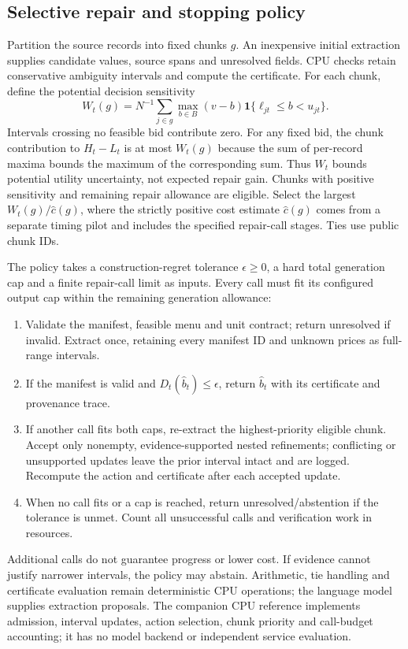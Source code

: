 \documentclass[sigconf,anonymous,nonacm]{acmart}
\begin{document}
\subsection{Selective repair and stopping policy}
Partition the source records into fixed chunks $g$. An inexpensive initial extraction supplies candidate values, source spans and unresolved fields. CPU checks retain conservative ambiguity intervals and compute the certificate. For each chunk, define the potential decision sensitivity
\[
W_t(g)=N^{-1}\sum_{j\in g}\max_{b\in B}
(v-b)\mathbf1\{\ell_{jt}\leq b<u_{jt}\}.
\]
Intervals crossing no feasible bid contribute zero. For any fixed bid, the chunk contribution to $H_t-L_t$ is at most $W_t(g)$ because the sum of per-record maxima bounds the maximum of the corresponding sum. Thus $W_t$ bounds potential utility uncertainty, not expected repair gain. Chunks with positive sensitivity and remaining repair allowance are eligible. Select the largest $W_t(g)/\widehat c(g)$, where the strictly positive cost estimate $\widehat c(g)$ comes from a separate timing pilot and includes the specified repair-call stages. Ties use public chunk IDs.

The policy takes a construction-regret tolerance $\epsilon\geq0$, a hard total generation cap and a finite repair-call limit as inputs. Every call must fit its configured output cap within the remaining generation allowance:
\begin{enumerate}
\item Validate the manifest, feasible menu and unit contract; return unresolved if invalid. Extract once, retaining every manifest ID and unknown prices as full-range intervals.
\item If the manifest is valid and $D_t(\widehat b_t)\leq\epsilon$, return $\widehat b_t$ with its certificate and provenance trace.
\item If another call fits both caps, re-extract the highest-priority eligible chunk. Accept only nonempty, evidence-supported nested refinements; conflicting or unsupported updates leave the prior interval intact and are logged. Recompute the action and certificate after each accepted update.
\item When no call fits or a cap is reached, return unresolved/abstention if the tolerance is unmet. Count all unsuccessful calls and verification work in resources.
\end{enumerate}
Additional calls do not guarantee progress or lower cost. If evidence cannot justify narrower intervals, the policy may abstain. Arithmetic, tie handling and certificate evaluation remain deterministic CPU operations; the language model supplies extraction proposals. The companion CPU reference implements admission, interval updates, action selection, chunk priority and call-budget accounting; it has no model backend or independent service evaluation.
\end{document}
